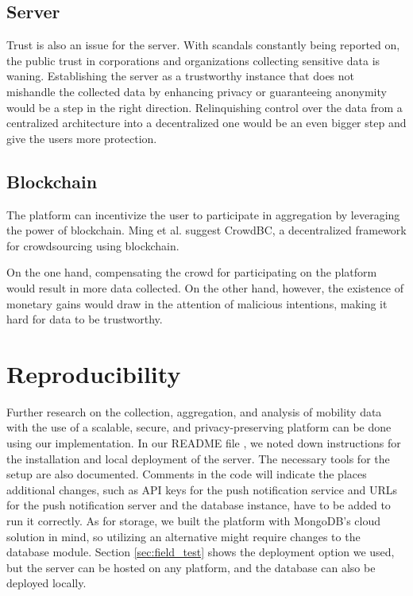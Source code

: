 \subsection{Server}
Trust is also an issue for the server. With scandals constantly being reported on, the public trust in corporations and organizations collecting sensitive data is waning. Establishing the server as a trustworthy instance that does not mishandle the collected data by enhancing privacy or guaranteeing anonymity would be a step in the right direction. Relinquishing control over the data from a centralized architecture into a decentralized one would be an even bigger step and give the users more protection.

\subsection{Blockchain}
The platform can incentivize the user to participate in aggregation by leveraging the power of blockchain. Ming et al. \cite{DBLP:journals/tpds/LiWYLZHLXD19} suggest CrowdBC, a decentralized framework for crowdsourcing using blockchain. 

On the one hand, compensating the crowd for participating on the platform would result in more data collected. On the other hand, however, the existence of monetary gains would draw in the attention of malicious intentions, making it hard for data to be trustworthy.

\section{Reproducibility}
Further research on the collection, aggregation, and analysis of mobility data with the use of a scalable, secure, and privacy-preserving platform can be done using our implementation. In our README file \cite{readme}, we noted down instructions for the installation and local deployment of the server. The necessary tools for the setup are also documented. Comments in the code will indicate the places additional changes, such as API keys for the push notification service and URLs for the push notification server and the database instance, have to be added to run it correctly. As for storage, we built the platform with MongoDB's cloud solution in mind, so utilizing an alternative might require changes to the database module. Section \ref{sec:field_test} shows the deployment option we used, but the server can be hosted on any platform, and the database can also be deployed locally.

